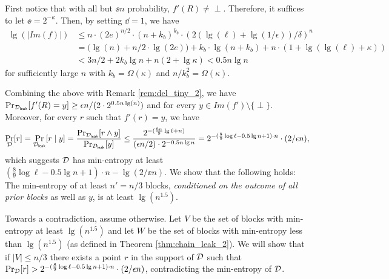 First notice that with all but $\ee n$ probability, $f'(R) \neq \perp$. Therefore, it suffices to let $\ee = 2^{-\kappa}$.
Then, by setting $\dd = 1$, we have
\begin{align*}
    \lg(|Im(f)|) &\leq  n \cdot (2e)^{n/2} \cdot (n+{k_b})^{k_b} \cdot \left ( 2(\lg(\ell) + \lg (1/\epsilon)) /\delta \right )^{n}\\
    &= \bigg(\lg(n) +n/2 \cdot \lg(2e) \bigg)+ {k_b} \cdot \lg (n+{k_b})  + n \cdot (1+\lg(\lg(\ell) + \kappa))\\
    & < 3n/2 + 2 k_b \lg n + n (2 + \lg \kappa) 
    < 0.5 n \lg n 
\end{align*}
for sufficiently large $n$ with $k_b = \Omega(\kappa)$ and $n/k_b^2 = \Omega(\kappa)$. 


Combining the above with Remark \ref{rem:del_tiny_2},
    we have $\Pr_{{\cal D}_{\mathsf{leak}}}[f'(R) =y] \geq \epsilon n / (2 \cdot 2^{0.5 n \lg (n)})$  and for every $y\in Im(f')\setminus\{\perp\}$.
Moreover, for every $r$ such that $f'(r) = y$, we have 
\begin{align}
\Pr_{{\cal D}}[r] = \Pr_{{\cal D}_{\mathsf{leak}}}[r \mid y] = \frac{\Pr_{{\cal D}_{\mathsf{leak}}}[r \wedge y]}{\Pr_{{\cal D}_{\mathsf{leak}}}[y]} \le
\frac{2^{-(\frac{8n}{9} \lg \ell+n)} }{(\epsilon n/2) \cdot 2^{-0.5n \lg n}} 
= 2^{-(\frac{8}{9} \log \ell - 0.5 \lg n + 1) \cdot n} \cdot (2/\epsilon n), \label{eq:min-ent-leak_2}
\end{align}
which suggests ${\cal D}$ has min-entropy at least 
$(\frac{8}{9} \log \ell - 0.5 \lg n + 1) \cdot n - \lg (2/\ee n)$.
We show that the following holds: 
The min-entropy of at least $n' = n/3$
blocks, {\em conditioned on the outcome of all prior blocks} as well as $y$, 
is at least $\lg(n^{1.5})$.

Towards a contradiction, assume otherwise.
Let $V$ be the set of blocks with min-entropy at least $\lg(n^{1.5})$
and let $W$ be the set of blocks with min-entropy
less than $\lg(n^{1.5})$ (as defined in Theorem \ref{thm:chain_leak_2}).
We will show that if $|V| \leq n/3$ there exists 
a point $r$ in the support of $\mathcal{{\cal D}}$
such that 
$\Pr_{\mathcal{{\cal D}}}[r] > 2^{-(\frac{8}{9} \log \ell - 0.5 \lg n + 1) \cdot n} \cdot (2/\epsilon n)$, contradicting the min-entropy of $\mathcal{{\cal D}}$.

